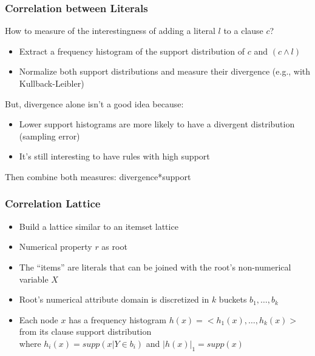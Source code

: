 \documentclass{beamer}
\begin{document}
\begin{frame}
\frametitle{Correlation between Literals}
  How to measure of the interestingness of adding a literal $l$ to a clause $c$?
  \begin{itemize}
   \item Extract a frequency histogram of the support distribution of $c$ and $(c \wedge l)$
   \item Normalize both support distributions and measure their divergence (e.g., with Kullback-Leibler)
  \end{itemize}
  But, divergence alone isn't a good idea because:
  \begin{itemize}
   \item Lower support histograms are more likely to have a divergent distribution (sampling error)
   \item It's still interesting to have rules with high support
  \end{itemize}
  Then combine both measures: divergence*support
\end{frame}
\begin{frame}
\frametitle{Correlation Lattice}
  \begin{itemize}
   \item Build a lattice similar to an itemset lattice 
   \item Numerical property $r$ as root 
   \item The ``items'' are literals that can be joined with the root's non-numerical variable $X$
   \item Root's numerical attribute domain is discretized in $k$ buckets $b_1,\dots,b_k$
   \item Each node $x$ has a frequency histogram $h(x)=<h_1(x),\ldots,h_k(x)>$ from its clause support distribution \\
      \quad where $h_i(x)=supp(x|Y \in b_i)$ \quad and \quad $|h(x)|_1=supp(x)$
  \end{itemize}
\end{frame}
\end{document}
